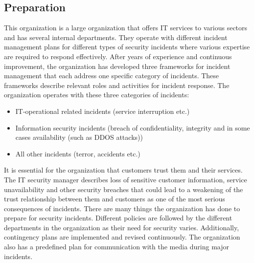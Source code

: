 \subsection{Preparation}
This organization is a large organization that offers IT services to various sectors and has several internal departments. They operate with different incident management plans for different types of security incidents where various expertise are required to respond effectively.  
After years of experience and continuous improvement, the organization has developed three frameworks for incident management that each address one specific category of incidents. These frameworks describe relevant roles and activities for incident response. The organization operates with these three categories of incidents:
\begin{itemize}
\item IT-operational related incidents (service interruption etc.)
\item Information security incidents (breach of confidentiality, integrity and in some cases availability (such as DDOS attacks))
\item All other incidents (terror, accidents etc.)
\end{itemize}
 
It is essential for the organization that customers trust them and their services. The IT security manager describes loss of sensitive customer information, service unavailability and other security breaches that could lead to a weakening of the trust relationship between them and customers as one of the most serious consequences of incidents. 
There are many things the organization has done to prepare for security incidents. Different policies are followed by the different departments in the organization as their need for security varies. Additionally, contingency plans are implemented and revised continuously. The organization also has a predefined plan for communication with the media during major incidents. 
